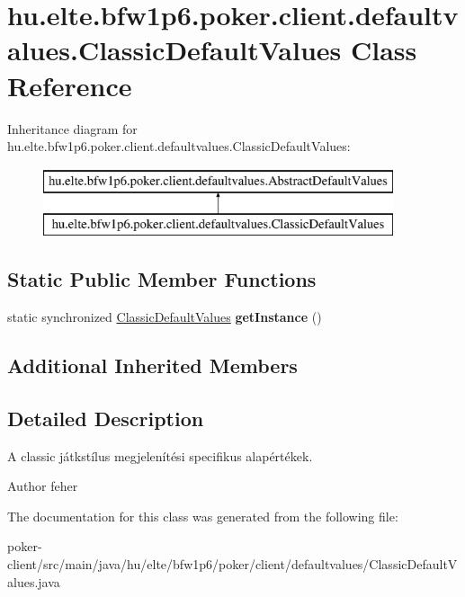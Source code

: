 \hypertarget{classhu_1_1elte_1_1bfw1p6_1_1poker_1_1client_1_1defaultvalues_1_1_classic_default_values}{}\section{hu.\+elte.\+bfw1p6.\+poker.\+client.\+defaultvalues.\+Classic\+Default\+Values Class Reference}
\label{classhu_1_1elte_1_1bfw1p6_1_1poker_1_1client_1_1defaultvalues_1_1_classic_default_values}
Inheritance diagram for hu.\+elte.\+bfw1p6.\+poker.\+client.\+defaultvalues.\+Classic\+Default\+Values\+:\begin{figure}[H]
\begin{center}
\leavevmode
\includegraphics[height=2.000000cm]{classhu_1_1elte_1_1bfw1p6_1_1poker_1_1client_1_1defaultvalues_1_1_classic_default_values}
\end{center}
\end{figure}
\subsection*{Static Public Member Functions}
\begin{DoxyCompactItemize}
\item 
\hypertarget{classhu_1_1elte_1_1bfw1p6_1_1poker_1_1client_1_1defaultvalues_1_1_classic_default_values_a27235b691ebc408e901f202ee9b596f9}{}static synchronized \hyperlink{classhu_1_1elte_1_1bfw1p6_1_1poker_1_1client_1_1defaultvalues_1_1_classic_default_values}{Classic\+Default\+Values} {\bfseries get\+Instance} ()\label{classhu_1_1elte_1_1bfw1p6_1_1poker_1_1client_1_1defaultvalues_1_1_classic_default_values_a27235b691ebc408e901f202ee9b596f9}

\end{DoxyCompactItemize}
\subsection*{Additional Inherited Members}


\subsection{Detailed Description}
A classic játkstílus megjelenítési specifikus alapértékek. \begin{DoxyAuthor}{Author}
feher 
\end{DoxyAuthor}


The documentation for this class was generated from the following file\+:\begin{DoxyCompactItemize}
\item 
poker-\/client/src/main/java/hu/elte/bfw1p6/poker/client/defaultvalues/Classic\+Default\+Values.\+java\end{DoxyCompactItemize}

